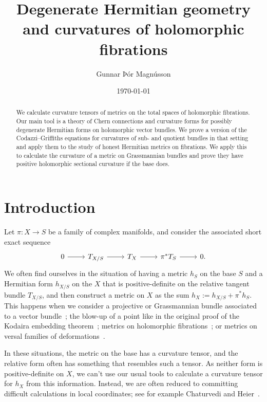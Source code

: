 \documentclass[10pt,a4paper]{amsart}
\author{Gunnar Þór Magnússon}
\date{\today}
\title[Degenerate Hermitian geometry]{Degenerate Hermitian geometry\\
and curvatures of holomorphic fibrations}
\theoremstyle{definition}
\begin{document}
\begin{abstract}
We calculate curvature tensors of metrics on the total spaces of holomorphic fibrations. Our main tool is a theory of Chern connections and curvature forms for possibly degenerate Hermitian forms on holomorphic vector bundles. We prove a version of the Codazzi--Griffiths equations for curvatures of sub- and quotient bundles in that setting and apply them to the study of honest Hermitian metrics on fibrations. We apply this to calculate the curvature of a metric on Grassmannian bundles and prove they have positive holomorphic sectional curvature if the base does.
\end{abstract}


\maketitle






\section*{Introduction}

Let $\pi : X \to S$ be a family of complex manifolds, and consider the associated short exact sequence
\[
\begin{tikzcd}
0 \ar[r] & T_{X/S} \ar[r] & T_X \ar[r] & \pi^*T_S \ar[r] & 0.
\end{tikzcd}
\]
We often find ourselves in the situation of having a metric $h_S$ on the base $S$ and a Hermitian form $h_{X/S}$ on the $X$ that is positive-definite on the relative tangent bundle $T_{X/S}$, and then construct a metric on $X$ as the sum $h_X := h_{X/S} + \pi^*h_S$. This happens when we consider a projective or Grassmannian bundle associated to a vector bundle~\cite{alvarez2016positive,alvarez2018projectivized,yang2019hirzebruch}; the blow-up of a point like in the original proof of the Kodaira embedding theorem~\cite{kodaira-embedding}; metrics on holomorphic fibrations~\cite{calabi-fibres-holomorphes}; or metrics on versal families of deformations~\cite{magnusson2012natural}.

In these situations, the metric on the base has a curvature tensor, and the relative form often has something that resembles such a tensor. As neither form is positive-definite on $X$, we can't use our usual tools to calculate a curvature tensor for $h_X$ from this information. Instead, we are often reduced to committing difficult calculations in local coordinates; see for example Chaturvedi and Heier~\cite[Theorem~1.1]{chaturvedi2020hermitian}.
\end{document}
